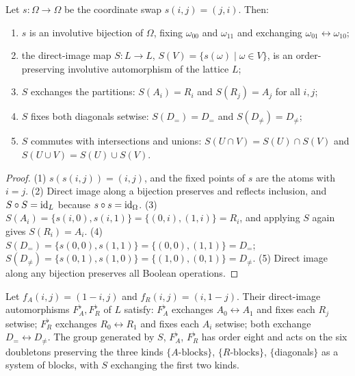 \begin{proposition}\label{ch07:prop-swap}
Let $s:\Omega\to\Omega$ be the coordinate swap $s(i,j)=(j,i)$. Then:
\begin{enumerate}
\item $s$ is an involutive bijection of $\Omega$, fixing $\omega_{00}$ and $\omega_{11}$ and exchanging $\omega_{01}\leftrightarrow\omega_{10}$;
\item the direct-image map $S:L\to L$, $S(V)=\{s(\omega)\mid \omega\in V\}$, is an order-preserving involutive automorphism of the lattice $L$;
\item $S$ exchanges the partitions: $S(A_{i})=R_{i}$ and $S(R_{j})=A_{j}$ for all $i,j$;
\item $S$ fixes both diagonals setwise: $S(D_{=})=D_{=}$ and $S(D_{\neq})=D_{\neq}$;
\item $S$ commutes with intersections and unions: $S(U\cap V)=S(U)\cap S(V)$ and $S(U\cup V)=S(U)\cup S(V)$.
\end{enumerate}
\end{proposition}

\begin{proof}
(1) $s(s(i,j))=(i,j)$, and the fixed points of $s$ are the atoms with $i=j$. (2) Direct image along a bijection preserves and reflects inclusion, and $S\circ S=\mathrm{id}_{L}$ because $s\circ s=\mathrm{id}_\Omega$. (3) $S(A_{i})=\{s(i,0),s(i,1)\}=\{(0,i),(1,i)\}=R_{i}$, and applying $S$ again gives $S(R_{i})=A_{i}$. (4) $S(D_{=})=\{s(0,0),s(1,1)\}=\{(0,0),(1,1)\}=D_{=}$; $S(D_{\neq})=\{s(0,1),s(1,0)\}=\{(1,0),(0,1)\}=D_{\neq}$. (5) Direct image along any bijection preserves all Boolean operations.
\end{proof}

\begin{proposition}\label{ch07:prop-flips}
Let $f_{A}(i,j)=(1-i,j)$ and $f_{R}(i,j)=(i,1-j)$. Their direct-image automorphisms $F_{A}^{\flat},F_{R}^{\flat}$ of $L$ satisfy: $F_{A}^{\flat}$ exchanges $A_{0}\leftrightarrow A_{1}$ and fixes each $R_{j}$ setwise; $F_{R}^{\flat}$ exchanges $R_{0}\leftrightarrow R_{1}$ and fixes each $A_{i}$ setwise; both exchange $D_{=}\leftrightarrow D_{\neq}$. The group generated by $S$, $F_{A}^{\flat}$, $F_{R}^{\flat}$ has order eight and acts on the six doubletons preserving the three kinds $\{A\text{-blocks}\}$, $\{R\text{-blocks}\}$, $\{$diagonals$\}$ as a system of blocks, with $S$ exchanging the first two kinds.
\end{proposition}


